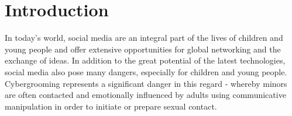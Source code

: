 \chapter{Introduction} 



\begin{comment}
    So ist es das Ziel von Oberkirch (2025), sprachliche Embeddings von DeBERTa v3 mit LIWC-basierten psychometrischen Features zu kombinieren, um die Erkennungsleistung zu steigern und gleichzeitig die Vorhersagen besser erklärbar zu machen. Konkret wird ein zweistufiges Modell aufgebaut: Zunächst feintuned man DeBERTa auf den segmentierten Chats, extrahiert dann pro Segment einen Feature-Vektor aus LIWC-Kategorien (z. B. Werte für Emotion, Kognition, soziale Prozesse etc.), und fügt beide Vektoren zusammen, um sie gemeinsam einem Klassifikator zuzuführen. Erste Experimente zeigen, dass diese Feature-Fusion die Erkennungsgenauigkeit verbessert und Aufschluss darüber geben kann, welche psychologischen Signale der Grooming-Kommunikation vom Modell genutzt werden. Insgesamt gelten hybride Modelle, die linguistisches Kontextverständnis eines großen Sprachmodells mit psycholinguistischen Indikatoren verknüpfen, als Best Practice, um subtile manipulative Strategien besser zu erkennen. Sie ermöglichen es zudem, die Entscheidungen des Modells inhaltlich zu interpretieren (etwa wenn hohe Werte in LIWC–Angst oder LIWC–Sexualität zum Ausschlag für eine Klassifizierung beitragen).
\end{comment}


In today's world, social media are an integral part of the lives of children and young people and offer extensive opportunities for global networking and the exchange of ideas. In addition to the great potential of the latest technologies, social media also pose many dangers, especially for children and young people. Cybergrooming represents a significant danger in this regard - whereby minors are often contacted and emotionally influenced by adults using communicative manipulation in order to initiate or prepare sexual contact.


